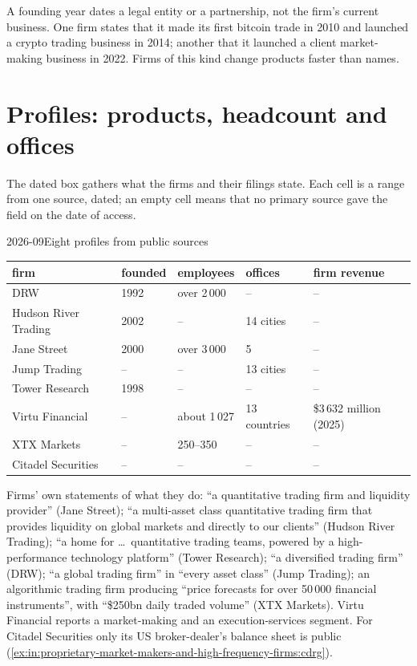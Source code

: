 \begin{remark}\label{rem:in:proprietary-market-makers-and-high-frequency-firms:founding}
A founding year dates a legal entity or a partnership, not the firm's current business. One firm states that it made
its first bitcoin trade in 2010 and launched a crypto trading business in 2014; another that it launched a client
market-making business in 2022. Firms of this kind change products faster than names.
\end{remark}

\section{Profiles: products, headcount and offices}

The dated box gathers what the firms and their filings state. Each cell is a range from one source, dated; an empty
cell means that no primary source gave the field on the date of access.

\begin{dated}{2026-09}{Eight profiles from public sources}\label{dat:in:proprietary-market-makers-and-high-frequency-firms:profiles}
\small
\begin{tabular}{@{}lllll@{}}
\toprule
firm & founded & employees & offices & firm revenue\\
\midrule
DRW & 1992 & over 2\,000 & -- & --\\
Hudson River Trading & 2002 & -- & 14 cities & --\\
Jane Street & 2000 & over 3\,000 & 5 & --\\
Jump Trading & -- & -- & 13 cities & --\\
Tower Research & 1998 & -- & -- & --\\
Virtu Financial & -- & about 1\,027 & 13 countries & \$3\,632 million (2025)\\
XTX Markets & -- & 250--350 & -- & --\\
Citadel Securities & -- & -- & -- & --\\
\bottomrule
\end{tabular}

\smallskip\noindent Firms' own statements of what they do: ``a quantitative trading firm and liquidity provider''
(Jane Street); ``a multi-asset class quantitative trading firm that provides liquidity on global markets and directly
to our clients'' (Hudson River Trading); ``a home for \dots\ quantitative trading teams, powered by a high-performance
technology platform'' (Tower Research); ``a diversified trading firm'' (DRW); ``a global trading firm'' in ``every
asset class'' (Jump Trading); an algorithmic trading firm producing ``price forecasts for over 50\,000 financial
instruments'', with ``\$250bn daily traded volume'' (XTX Markets). Virtu Financial reports a market-making and an
execution-services segment. For Citadel Securities only its US broker-dealer's balance sheet is public
(\cref{ex:in:proprietary-market-makers-and-high-frequency-firms:cdrg}).
\end{dated}

